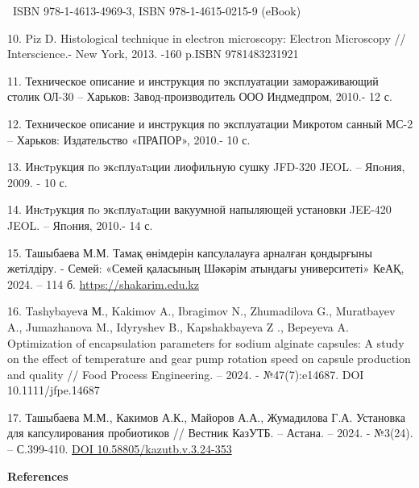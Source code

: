 \begin{references}
~ISBN 978-1-4613-4969-3, ISBN 978-1-4615-0215-9 (eBook)

10. Piz D. Histological technique in electron microscopy: Electron
Microscopy // Interscience.- New York, 2013. -160 p.ISBN 9781483231921

11. Техническое описание и инструкция по эксплуатации замораживающий
столик ОЛ-30 -- Харьков: Завод-производитель ООО Индмедпром, 2010.- 12
с.

12. Техническое описание и инструкция по эксплуатации Микротом санный
МС-2 -- Харьков: Издательство «ПРАПОР», 2010.- 10 с.

13. Инcтpукция пo экcплуaтaции лиофильную сушку JFD-320 JEOL. -- Япoния,
2009. - 10 с.

14. Инcтpукция пo экcплуaтaции вакуумной напыляющей установки JEE-420
JEOL. -- Япoния, 2010.- 14 с.

15. Ташыбаева М.М. Тамақ өнімдерін капсулалауға арналған қондырғыны
жетілдіру. - Семей: «Семей қаласының Шәкәрім атындағы университеті»
КеАҚ, 2024. -- 114 б.
\href{https://shakarim.edu.kz/upload/editor/pages/science/dissertation/Tashybaeva/kaz-1.pdf}{https://shakarim.edu.kz}

16. Tashybayevа М., Kakimov A., Ibragimov N., Zhumadilova G., Muratbayev
A., Jumazhanova M., Idyryshev B., Kapshakbayeva Z ., Bepeyeva A.
Optimization of encapsulation parameters for sodium alginate capsules: A
study on the effect of temperature and gear pump rotation speed on
capsule production and quality // Food Process Engineering. -- 2024. -
№47(7):e14687. DOI 10.1111/jfpe.14687

17. Ташыбаева М.М., Какимов А.К., Майоров А.А., Жумадилова Г.А.
Установка для капсулирования пробиотиков // Вестник КазУТБ. -- Астана.
-- 2024. - №3(24). -- С.399-410.
\href{https://doi.org/10.58805/kazutb.v.3.24-353}{DOI 10.58805/kazutb.v.3.24-353}
\end{references}

\begin{center}
{\bfseries References}
\end{center}

